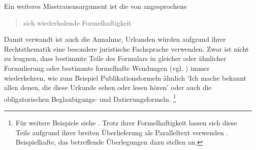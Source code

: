 Ein weiteres Misstrauensargument ist die von \citeauthor{wegera2000}
angesprochene \blockcquote[1311]{wegera2000}{sich wiederholende
Formelhaftigkeit}. Damit verwandt ist auch die Annahme, Urkunden würden
aufgrund ihrer Rechtsthematik eine besondere juristische Fachsprache verwenden.
Zwar ist nicht zu leugnen, dass bestimmte Teile des Formulars in gleicher oder
ähnlicher Formulierung oder bestimmte formelhafte Wendungen (vgl.
) immer wiederkehren, wie zum Beispiel
Publikationsformeln ähnlich
`Ich mache bekannt allen denen, die diese Urkunde sehen oder lesen hören'
oder auch die obligatorischen Beglaubigungs- und Datierungsformeln.%
%
	\footnote{Für weitere Beispiele siehe \citet[10, Anm.~5--8]{schulze2011}.
	Trotz ihrer Formelhaftigkeit lassen sich diese Teile aufgrund ihrer breiten
	Überlieferung als Paralleltext verwenden
	\autocite[siehe][]{cysouwwaelchli2007}. Beispielhafte, das \CAO{}
	betreffende Überlegungen dazu stellen \citet[174--175]{beckerschallert2022b} an.}
%
% 
% 
% 
